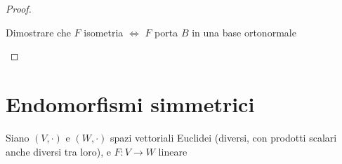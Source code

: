 \begin{proof}
\begin{enumerate}
{        Dimostrare che $ F $ isometria $ \iff $ $ F $ porta $ B $ in una base ortonormale
    }{}{}
\end{enumerate}
\end{proof}

\section{Endomorfismi simmetrici}

Siano $ (V, \cdot )$ e $ (W, \cdot ) $ spazi vettoriali Euclidei (diversi, con prodotti scalari anche diversi tra loro), e $ F: V \to W$ lineare


